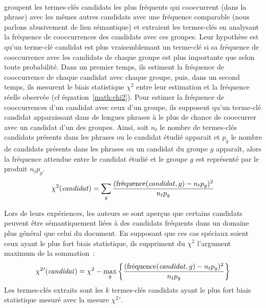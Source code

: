         ~\\ groupent les termes-clés
        candidats les plus fréquents qui cooccurrent (dans la phrase) avec les
        mêmes autres candidats avec une fréquence comparable (nous parlons
        abusivement de lien sémantique) et extraient les termes-clés en
        analysant la fréquence de cooccurrences des candidats avec ces groupes.
        Leur hypothèse est qu'un terme-clé candidat est plus vraisemblemant un
        terme-clé si sa fréquence de cooccurrence avec les candidats de chaque
        groupe est plus importante que selon toute probabilité. Dans un premier
        temps, ils estiment la fréquence de cooccurrence de chaque candidat avec
        chaque groupe, puis, dans un second temps, ils mesurent le biais
        statistique $\chi^2$ entre leur estimation et la fréquence réelle
        observée (cf équation~\ref{math:chi2}). Pour estimer la fréquence de
        cooccurrences d'un candidat avec ceux d'un groupe, ils supposent qu'un
        terme-clé candidat apparaissant dans de longues phrases à le plus de
        chance de cooccurrer avec un candidat d'un des groupes. Ainsi, soit
        $n_t$ le nombre de termes-clés candidats présents dans les phrases ou le
        candidat étudié apparait et $p_g$ le nombre de candidats présents dans
        les phrases ou un candidat du groupe $g$ apparaît, alors la fréquence
        attendue entre le candidat étudié et le groupe $g$ est représenté par le
        produit $n_tp_g$.
        \begin{align}
          \chi^2(\text{\textit{candidat}}) = \sum_{g} \frac{(\text{fréquence}(\text{\textit{candidat}}, g) - n_tp_g)^2}{n_tp_g} \label{math:chi2}
        \end{align}
        
        Lors de leurs expériences, les auteurs se sont aperçus que certains
        candidats peuvent être sémantiquement liées à des candidats fréquents
        dans un domaine plus général que celui du document. En supposant que ces
        cas spéciaux soient ceux ayant le plus fort biais statistique, ils
        suppriment du $\chi^2$ l'argument maximum de la sommation~:
        \begin{align}
          \chi^2{'}(\text{\textit{candidat}}) = \chi^2 - \max_{g}\left\{\frac{(\text{fréquence}(\text{\textit{candidat}}, g) - n_tp_g)^2}{n_tp_g}\right\}
        \end{align}
        Les termes-clés extraits sont les $k$ termes-clés candidats ayant le
        plus fort biais statistique mesuré avec la mesure $\chi^2{'}$.

